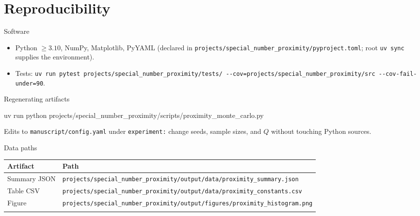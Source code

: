 \documentclass[
  ignorenonframetext,
]{beamer}
\author{\texorpdfstring{}{}}
\date{}
\newenvironment{Shaded}{}{}
\newcommand{\ExtensionTok}[1]{#1}
\newcommand{\NormalTok}[1]{#1}
\newcounter{none} %
\providecommand{\tightlist}{%
  \setlength{\itemsep}{0pt}\setlength{\parskip}{0pt}}
\begin{document}
\section{Reproducibility}\label{reproducibility}

\begin{frame}[fragile]{Software}
\protect{}\label{software}
\begin{itemize}
\tightlist
\item
  Python \(\geq 3.10\), NumPy, Matplotlib, PyYAML (declared in
  \texttt{projects/special\_number\_proximity/pyproject.toml}; root
  \texttt{uv\ sync} supplies the environment).
\item
  Tests:
  \texttt{uv\ run\ pytest\ projects/special\_number\_proximity/tests/\ -\/-cov=projects/special\_number\_proximity/src\ -\/-cov-fail-under=90}.
\end{itemize}
\end{frame}

\begin{frame}[fragile]{Regenerating artifacts}
\protect{}\label{regenerating-artifacts}
\begin{Shaded}
\begin{Highlighting}[]
\ExtensionTok{uv}\NormalTok{ run python projects/special\_number\_proximity/scripts/proximity\_monte\_carlo.py}
\end{Highlighting}
\end{Shaded}

Edits to \texttt{manuscript/config.yaml} under \texttt{experiment:}
change seeds, sample sizes, and \(Q\) without touching Python sources.
\end{frame}

\begin{frame}[fragile]{Data paths}
\protect{}\label{data-paths}
{\def\LTcaptype{none} %
\begin{longtable}[]{@{}
  >{\raggedright\arraybackslash}p{}
  >{\raggedright\arraybackslash}p{}@{}}
\toprule\noalign{}
\begin{minipage}[b]{\linewidth}\raggedright
Artifact
\end{minipage} & \begin{minipage}[b]{\linewidth}\raggedright
Path
\end{minipage} \\
\midrule\noalign{}
\endhead
Summary JSON &
\texttt{projects/special\_number\_proximity/output/data/proximity\_summary.json} \\
Table CSV &
\texttt{projects/special\_number\_proximity/output/data/proximity\_constants.csv} \\
Figure &
\texttt{projects/special\_number\_proximity/output/figures/proximity\_histogram.png} \\
\bottomrule\noalign{}
\end{longtable}
}
\end{frame}
\end{document}
